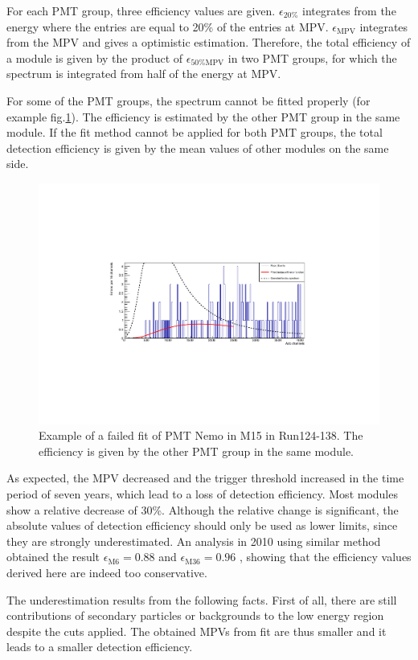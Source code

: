 For each PMT group, three efficiency values are given. $\epsilon_{20\%}$ integrates from the energy where the entries are equal to 20\% of the entries at MPV. $\epsilon_{\mathrm{MPV}}$ integrates from the MPV and gives a optimistic estimation. Therefore, the total efficiency of a module is given by the product of $\epsilon_{50\%\mathrm{MPV}}$ in two PMT groups, for which the spectrum is integrated from half of the energy at MPV.

For some of the PMT groups, the spectrum cannot be fitted properly (for example fig.\ref{fig:fail_M15}). The efficiency is estimated by the other PMT group in the same module. If the fit method cannot be applied for both PMT groups, the total detection efficiency is given by the mean values of other modules on the same side.


\begin{figure}[ht!]
  \centering
  \includegraphics[width=0.7\textwidth{}]{./fig/M15fail.pdf}
  \caption{Example of a failed fit of PMT Nemo in M15 in Run124-138. The efficiency is given by the other PMT group in the same module.}
  \label{fig:fail_M15}
\end{figure}

As expected, the MPV decreased and the trigger threshold increased in the time period of seven years, which lead to a loss of detection efficiency. Most modules show a relative decrease of 30\%. Although the relative change is significant, the absolute values of detection efficiency should only be used as lower limits, since they are strongly underestimated. An analysis in 2010 using similar method obtained the result $\epsilon_{\mathrm{M6}}=0.88$ and $\epsilon_{\mathrm{M36}}=0.96$ \cite{Nie10}, showing that the efficiency values derived here are indeed too conservative.

The underestimation results from the following facts. First of all, there are still contributions of secondary particles or backgrounds to the low energy region despite the cuts applied. The obtained MPVs from fit are thus smaller and it leads to a smaller detection efficiency.

